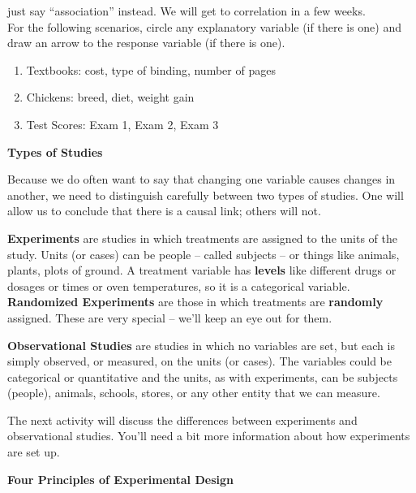   just say ``association'' instead. We will get to correlation in a
  few weeks.\\
For the following scenarios, circle any explanatory variable (if there
is one) and draw an arrow to the response variable (if there is
one). %
\begin{enumerate}
\item Textbooks:  cost, type of binding, number of pages\\
\item Chickens:  breed, diet,  weight gain\\
\item Test Scores:  Exam 1, Exam 2, Exam 3\\
\end{enumerate}


  \begin{center}
    {\bf Types of Studies}
  \end{center}
  Because we do often want to say that changing one variable causes
  changes in another, we need to distinguish carefully between two
  types of studies. One will allow us to conclude that there is a causal
  link;   others will not.

  {\bf Experiments} are studies in which treatments are assigned to
  the units of the study. Units (or cases) can be people -- called
  subjects -- or things like animals, plants, plots of ground.  A
  treatment variable has {\bf levels} like different drugs or dosages
  or times or oven temperatures, so it is a categorical variable. \\
  {\bf Randomized Experiments} are those in which treatments are {\bf
    randomly} assigned.  These are very special -- we'll keep an eye
  out for them.


  {\bf Observational Studies} are studies in which no variables are
  set, but each is simply observed, or measured, on the units (or
  cases). The variables could be categorical or quantitative and the
  units, as with experiments, can be subjects (people), animals,
  schools, stores, or any other entity that we can measure. 

  The next activity will discuss the differences between experiments
  and observational studies.  You'll need a bit more information about
  how experiments are set up.

  {\bf Four Principles of Experimental Design}

